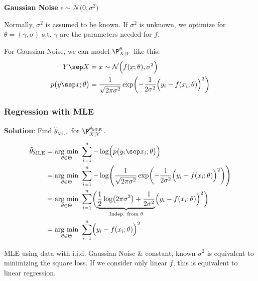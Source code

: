  \textbf{Gaussian Noise} $\epsilon \sim \mathcal{N}\bigl( 0, \sigma^2 \bigr)$\\

{\footnotesize
    \remark Normally, $\sigma^2$ is assumed to be known. If $\sigma^2$ is unknown, we optimize for $\theta = (\gamma, \sigma)$ s.t. $\gamma$ are the parameters needed for $f$.
}

For Gaussian Noise, we can model $\P_{X|Y}^\theta$ like this:
\begin{align*}
    Y\sep X                         &= x \sim \mathcal{N}\Bigl( f(x;\theta), \sigma^2 \Bigr) \\
    p\bigl( y \sep x;\theta \bigr)  &= \frac{1}{\sqrt{2\pi\sigma^2}}\exp\biggl( -\frac{1}{2\sigma^2} \Bigl( y_i - f(x_i;\theta) \Bigr)^2 \biggr)
\end{align*}

\newpage

\subsubsection{Regression with MLE}

\textbf{Solution}: Find $\hat{\theta}_\text{MLE}$ for $\P_{X|Y}^{\hat{\theta}_\text{MLE}}$.
{\footnotesize
\begin{align*}
\hat{\theta}_\text{MLE}     &=\underset{\theta\in\Theta}{\text{arg min}}\ \sum_{i=1}^n -\log \Bigl( p\bigl( y_i \sep x_i ; \theta \bigr) \Bigr)                                                                             \\
                            &=\underset{\theta\in\Theta}{\text{arg min}}\ \sum_{i=1}^n -\log \Biggl( \frac{1}{\sqrt{2\pi\sigma^2}}\exp\biggl( -\frac{1}{2\sigma^2} \Bigl( y_i - f(x_i;\theta) \Bigr)^2 \biggr) \Biggr)      \\                        
                            &=\underset{\theta\in\Theta}{\text{arg min}}\ \sum_{i=1}^n \biggl( \underbrace{\frac{1}{2}\log\bigl( 2\pi\sigma^2 \bigr) + \frac{1}{2\sigma^2}}_\text{Indep. from $\theta$}\Bigl( y_i - f(x_i;\theta) \Bigr)^2 \biggr)                   \\
                            &=\underset{\theta\in\Theta}{\text{arg min}}\ \sum_{i=1}^n \Bigl( y_i - f(x_i;\theta) \Bigr)^2
\end{align*}
}

MLE using data with i.i.d. Gaussian Noise \& constant, known $\sigma^2$ is equivalent to minimizing the square loss. If we consider only linear $f$, this is equivalent to linear regression.

